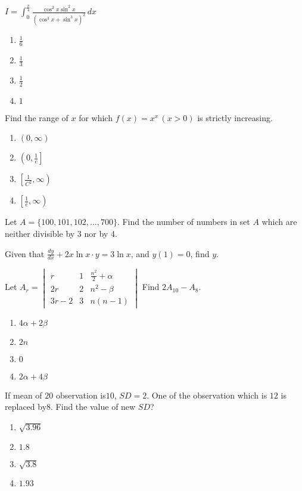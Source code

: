 
\iffalse
\title{06-04-2024}
\author{EE24BTECH11004}
\section{mcq-single}
\fi

\item $I = \int_{0}^{\frac{\pi}{4}} \frac{\cos^2 x \sin^2 x}{\left( \cos^3 x + \sin^3 x \right)^2} \, dx$
\begin{enumerate}
    \item $\frac{1}{6}$
    \item $\frac{1}{3}$
    \item $\frac{1}{2}$
    \item $1$
\end{enumerate}
\item Find the range of $x$ for which $f(x) = x^x \, (x > 0)$ is strictly increasing.
\begin{enumerate}
    \item $ (0, \infty) $
    \item $ \left( 0, \frac{1}{e} \right] $
    \item $ \left[ \frac{1}{C^2}, \infty \right) $
    \item $ \left[ \frac{1}{e}, \infty \right) $
\end{enumerate}
\item Let $A = \{100, 101, 102, \dots, 700\}$. Find the number of numbers in set $A$ which are neither divisible by 3 nor by 4.
\item Given that $\frac{dy}{dx} + 2x \ln{x} \cdot y = 3 \ln{x}$, and $y(1) = 0$, find $y$.
\item Let 
$A_r = \begin{vmatrix}
r & 1 & \frac{n^2}{2} + \alpha \\
2r & 2 & n^2 - \beta \\
3r - 2 & 3 & n(n-1)
\end{vmatrix}$
Find $2A_{10} - A_8$.
\begin{enumerate}
    \item $ 4\alpha + 2\beta $
    \item $ 2n $
    \item $ 0 $
    \item $ 2\alpha + 4\beta $
\end{enumerate}
\item If mean of $20$ observation is$ 10$, $SD = 2$. One of the observation which is $12$ is replaced by$ 8$.
Find the value of new $SD$?
\begin{enumerate}
    \item $ \sqrt{3.96} $
\item $1.8$
\item $ \sqrt{3.8} $
\item $1.93$
\end{enumerate}
